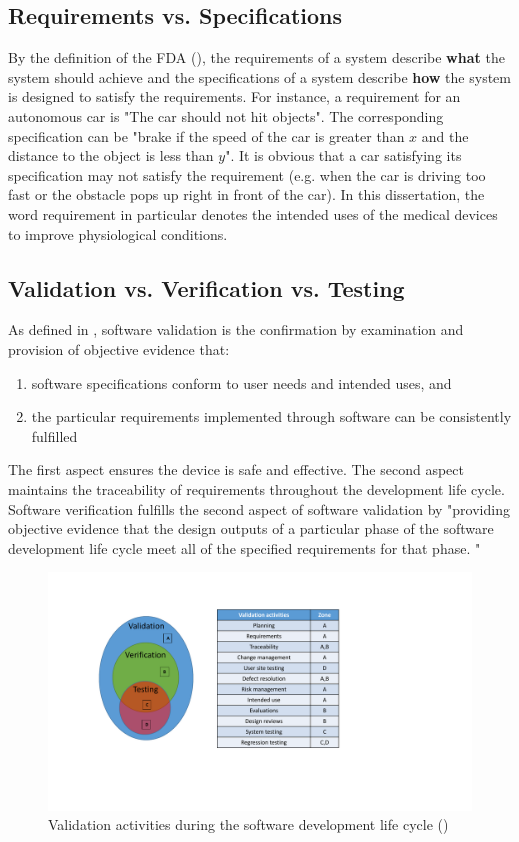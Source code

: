 \subsection{Requirements vs. Specifications}
By the definition of the FDA (\cite{fda3}), the requirements of a system describe \textbf{what} the system should achieve and the specifications of a system describe \textbf{how} the system is designed to satisfy the requirements. 
For instance, a requirement for an autonomous car is "The car should not hit objects". 
The corresponding specification can be "brake if the speed of the car is greater than $x$ and the distance to the object is less than $y$". 
It is obvious that a car satisfying its specification may not satisfy the requirement (e.g. when the car is driving too fast or the obstacle pops up right in front of the car). 
In this dissertation, the word requirement in particular denotes the intended uses of the medical devices to improve physiological conditions.

\subsection{Validation vs. Verification vs. Testing}
As defined in \cite{fda2}, software validation is the confirmation by examination and provision of objective evidence that:
\begin{enumerate}
	\item software specifications conform to user needs and intended uses, and 
	\item the particular requirements implemented through software can be consistently fulfilled
\end{enumerate}
The first aspect ensures the device is safe and effective. 
The second aspect maintains the traceability of requirements throughout the development life cycle.
Software verification fulfills the second aspect of software validation by "providing objective evidence that the design outputs of a particular phase of the software development life cycle meet all of the specified requirements for that phase. "
\begin{figure}[t]
		\centering
		\includegraphics[width=\textwidth]{figs/validation.pdf}
		\caption{Validation activities during the software development life cycle (\cite{Vogel})}
		\label{fig:validation}
\end{figure}

